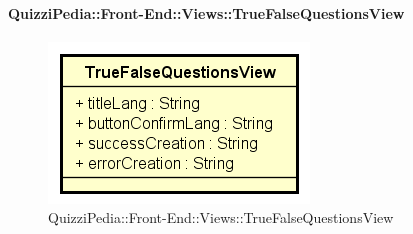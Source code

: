 \paragraph{QuizziPedia::Front-End::Views::TrueFalseQuestionsView}
\begin{figure} [ht]
	\centering
	\includegraphics[scale=0.80]{UML/Classi/Front-End/QuizziPedia_Front-end_Views_TrueFalseQuestionsView.png}
	\caption{QuizziPedia::Front-End::Views::TrueFalseQuestionsView}
\end{figure} \FloatBarrier
